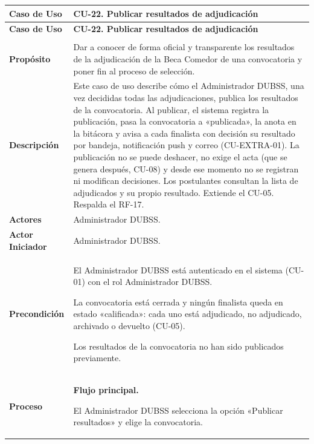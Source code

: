 \begin{longtable}{>{\raggedright\arraybackslash}p{2.9cm} >{\raggedright\arraybackslash}p{12.6cm}}
\toprule
\textbf{Caso de Uso} & \textbf{CU-22. Publicar resultados de adjudicación} \\
\midrule
\endfirsthead
\toprule
\textbf{Caso de Uso} & \textbf{CU-22. Publicar resultados de adjudicación} \\
\midrule
\endhead
\endfoot
\bottomrule
\multicolumn{2}{l}{\textit{Nota.} Elaboración propia.} \\
\endlastfoot
\textbf{Propósito} & Dar a conocer de forma oficial y transparente los resultados de la adjudicación de la Beca Comedor de una convocatoria y poner fin al proceso de selección. \\
\midrule
\textbf{Descripción} & Este caso de uso describe cómo el Administrador DUBSS, una vez decididas todas las adjudicaciones, publica los resultados de la convocatoria. Al publicar, el sistema registra la publicación, pasa la convocatoria a «publicada», la anota en la bitácora y avisa a cada finalista con decisión su resultado por bandeja, notificación push y correo (CU-EXTRA-01). La publicación no se puede deshacer, no exige el acta (que se genera después, CU-08) y desde ese momento no se registran ni modifican decisiones. Los postulantes consultan la lista de adjudicados y su propio resultado. Extiende el CU-05. Respalda el RF-17. \\
\midrule
\textbf{Actores} & Administrador DUBSS. \\
\midrule
\textbf{Actor Iniciador} & Administrador DUBSS. \\
\midrule
\textbf{Precondición} & \vspace{-\baselineskip}\begin{cuvin}
    \item El Administrador DUBSS está autenticado en el sistema (CU-01) con el rol Administrador DUBSS.
    \item La convocatoria está cerrada y ningún finalista queda en estado «calificada»: cada uno está adjudicado, no adjudicado, archivado o devuelto (CU-05).
    \item Los resultados de la convocatoria no han sido publicados previamente.
\end{cuvin} \\
\midrule
\textbf{Proceso} & \textbf{Flujo principal.}
\begin{cupasos}
    \item El Administrador DUBSS selecciona la opción «Publicar resultados» y elige la convocatoria.

\end{cupasos}
\end{longtable}
